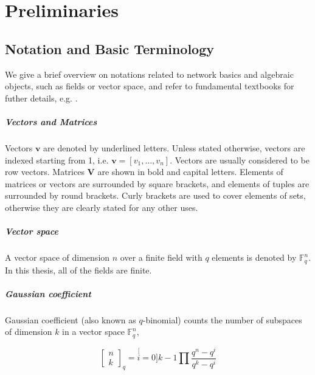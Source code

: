 \chapter{Preliminaries} \label{chap:preliminaries}

\section{Notation and Basic Terminology}

We give a brief overview on notations related to network basics and
algebraic objects, such as fields or vector space, and refer to fundamental
textbooks for futher details, e.g. \cite{Roth:2006,Irving:2003,Ho:2008}.

\paragraph{Vectors and Matrices}

Vectors $\boldsymbol{v}$ are denoted by underlined letters. Unless
stated otherwise, vectors are indexed starting from 1, i.e. $\boldsymbol{v}=\left[v_{1},\ldots,v_{n}\right]$.
Vectors are usually considered to be row vectors. Matrices $\boldsymbol{V}$
are shown in bold and capital letters. Elements of matrices or vectors
are surrounded by square brackets, and elements of tuples are surrounded
by round brackets. Curly brackets are used to cover elements of sets,
otherwise they are clearly stated for any other uses.

\paragraph{Vector space}

A vector space of dimension $n$ over a finite field with $q$ elements
is denoted by $\ensuremath{\mathbb{F}}_{q}^{n}$. In this thesis,
all of the fields are finite.

\paragraph{Gaussian coefficient}

Gaussian coefficient (also known as $q$-binomial) counts the number
of subspaces of dimension $k$ in a vector space $\ensuremath{\mathbb{F}}_{q}^{n}$,

\[
\left[\begin{array}{c}
n\\
k
\end{array}\right]_{q}=\stackrel[i=0]{k-1}{\prod}\frac{q^{n}-q^{i}}{q^{k}-q^{i}}
\]


